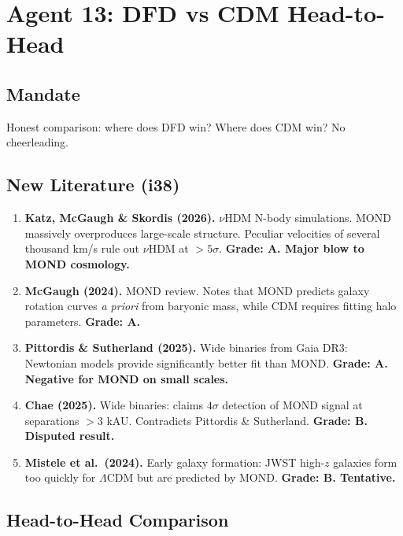 \documentclass[11pt,a4paper]{article}
\begin{document}
\newpage
\section{Agent 13: DFD vs CDM Head-to-Head}
\label{sec:agent13}

\subsection{Mandate}

Honest comparison: where does DFD win? Where does CDM win? No cheerleading.

\subsection{New Literature (i38)}

\begin{enumerate}
\item \textbf{Katz, McGaugh \& Skordis (2026).} $\nu$HDM N-body simulations. MOND massively overproduces large-scale structure. Peculiar velocities of several thousand km/s rule out $\nu$HDM at $> 5\sigma$. \textbf{Grade: A. Major blow to MOND cosmology.}

\item \textbf{McGaugh (2024).} MOND review. Notes that MOND predicts galaxy rotation curves \emph{a priori} from baryonic mass, while CDM requires fitting halo parameters. \textbf{Grade: A.}

\item \textbf{Pittordis \& Sutherland (2025).} Wide binaries from Gaia DR3: Newtonian models provide significantly better fit than MOND. \textbf{Grade: A. Negative for MOND on small scales.}

\item \textbf{Chae (2025).} Wide binaries: claims $4\sigma$ detection of MOND signal at separations $> 3$ kAU. Contradicts Pittordis \& Sutherland. \textbf{Grade: B. Disputed result.}

\item \textbf{Mistele et al.\ (2024).} Early galaxy formation: JWST high-$z$ galaxies form too quickly for $\Lambda$CDM but are predicted by MOND. \textbf{Grade: B. Tentative.}
\end{enumerate}

\subsection{Head-to-Head Comparison}
\end{document}

